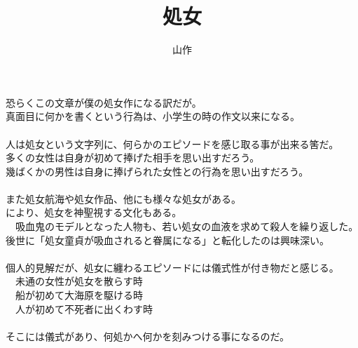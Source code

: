 \documentclass[b5j,10pt]{tbook}
\title{処女}
\author{\rensuji{J}山\rensuji{B}作}
\date{}
\begin{document}
\maketitle

恐らくこの文章が僕の処女作になる訳だが。 \\
真面目に何かを書くという行為は、小学生の時の作文以来になる。 \\
\\
人は処女という文字列に、何らかのエピソードを感じ取る事が出来る筈だ。 \\
多くの女性は自身が初めて捧げた相手を思い出すだろう。 \\
幾ばくかの男性は自身に捧げられた女性との行為を思い出すだろう。 \\
\\
 また処女航海や処女作品、他にも様々な処女がある。 \\
により、処女を神聖視する文化もある。 \\
　吸血鬼のモデルとなった人物も、若い処女の血液を求めて殺人を繰り返した。 \\
後世に「処女童貞が吸血されると眷属になる」と転化したのは興味深い。 \\
\\
個人的見解だが、処女に纏わるエピソードには儀式性が付き物だと感じる。 \\
　未通の女性が処女を散らす時 \\
　船が初めて大海原を駆ける時 \\
　人が初めて不死者に出くわす時 \\
\\
そこには儀式があり、何処かへ何かを刻みつける事になるのだ。 \\
\end{document}
